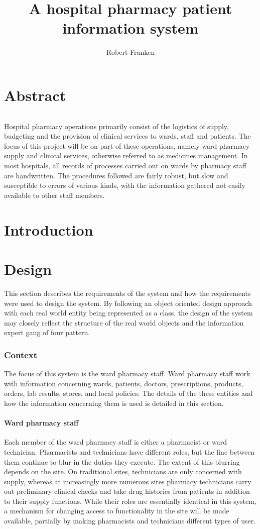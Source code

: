 \documentclass[letterpaper]{amsart}
\author{Robert Franken}
\title{A hospital pharmacy patient information system}
\begin{document}
\maketitle
\part{Abstract}
\paragraph{} Hospital pharmacy operations primarily consist of the logistics of supply, budgeting and the provision of clinical services to wards, staff and patients. 
The focus of this project will be on part of these operations, namely ward pharmacy supply and clinical services, otherwise referred to as medicines management. In most hospitals, all records of processes carried out on wards by pharmacy staff are handwritten. The procedures followed are fairly robust, but slow and susceptible to errors of various kinds, with the information gathered not easily available to other staff members.
\part{Introduction}

\part{Design}
This section describes the requirements of the system and how the requirements were used to design the system. By following an object oriented design approach with each real world entity being represented as a class, the design of the system may closely reflect the structure of the real world objects and the information expert gang of four pattern.

\section{Context} 
The focus of this system is the ward pharmacy staff.  Ward pharmacy staff work with information concerning wards, patients, doctors, prescriptions, products, orders, lab results, stores, and local policies.  The details of the these entities and how the information concerning them is used is detailed in this section.
\subsection{Ward pharmacy staff}
Each member of the ward pharmacy staff is either a pharmacist or ward technician.  Pharmacists and technicians have different roles, but the line between them continue to blur in the duties they execute.  The extent of this blurring depends on the site.  On traditional sites, technicians are only concerned with supply, whereas at increasingly more numerous sites pharmacy technicians carry out preliminary clinical checks and take drug histories from patients in addition to their supply functions.
While their roles are essentially identical in this system, a mechanism for changing access to functionality in the site will be made available, partially by making pharmacists and technicians different types of user.
\end{document}
